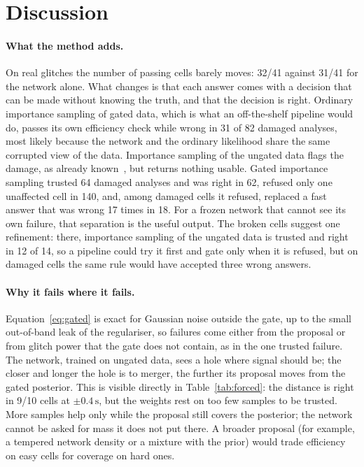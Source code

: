 \documentclass{openjournal}
\begin{document}
\section{Discussion}
\label{sec:discussion}

\paragraph{What the method adds.}
On real glitches the number of passing cells barely moves: 32/41 against 31/41 for the network alone.
What changes is that each answer comes with a decision that can be made without knowing the truth, and that the decision is right.
Ordinary importance sampling of gated data, which is what an off-the-shelf pipeline would do, passes its own efficiency check while wrong in 31 of 82 damaged analyses, most likely because the network and the ordinary likelihood share the same corrupted view of the data.
Importance sampling of the ungated data flags the damage, as already known~\cite{Dax2023is}, but returns nothing usable.
Gated importance sampling trusted 64 damaged analyses and was right in 62, refused only one unaffected cell in 140, and, among damaged cells it refused, replaced a fast answer that was wrong 17 times in 18.
For a frozen network that cannot see its own failure, that separation is the useful output.
The broken cells suggest one refinement: there, importance sampling of the ungated data is trusted and right in 12 of 14, so a pipeline could try it first and gate only when it is refused, but on damaged cells the same rule would have accepted three wrong answers.

\paragraph{Why it fails where it fails.}
Equation~\eqref{eq:gated} is exact for Gaussian noise outside the gate, up to the small out-of-band leak of the regulariser, so failures come either from the proposal or from glitch power that the gate does not contain, as in the one trusted failure.
The network, trained on ungated data, sees a hole where signal should be; the closer and longer the hole is to merger, the further its proposal moves from the gated posterior.
This is visible directly in Table~\ref{tab:forced}: the distance is right in 9/10 cells at $\pm0.4\,\mathrm{s}$, but the weights rest on too few samples to be trusted.
More samples help only while the proposal still covers the posterior; the network cannot be asked for mass it does not put there.
A broader proposal (for example, a tempered network density or a mixture with the prior) would trade efficiency on easy cells for coverage on hard ones.
\end{document}
